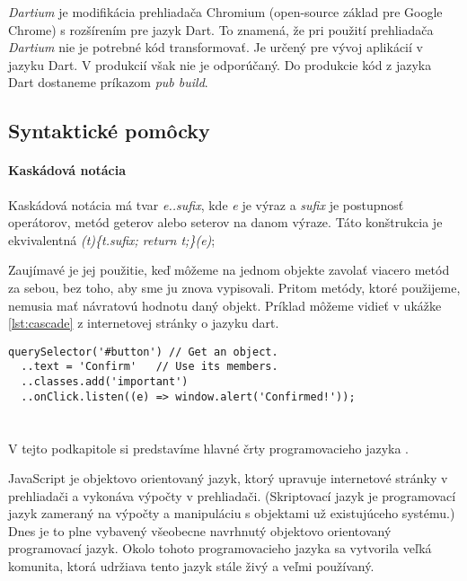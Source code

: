 \emph{Dartium} je modifikácia prehliadača Chromium (open-source základ pre Google Chrome) s rozšírením pre jazyk Dart. To znamená, že pri použití prehliadača \emph{Dartium} nie je potrebné kód transformovať. Je určený pre vývoj aplikácií v jazyku Dart. V produkcií však nie je odporúčaný. Do produkcie kód z jazyka Dart dostaneme príkazom \emph{pub build}.%

\subsection{Syntaktické pomôcky}

\paragraph{Kaskádová notácia}
Kaskádová notácia má tvar \emph{e..sufix}, kde \emph{e} je výraz a \emph{sufix} je postupnosť operátorov, metód geterov alebo seterov na danom výraze. Táto konštrukcia je ekvivalentná \emph{(t)\{t.sufix; return t;\}(e)};

Zaujímavé je jej použitie, keď môžeme na jednom objekte zavolať viacero metód za sebou, bez toho, aby sme ju znova vypisovali. Pritom metódy, ktoré použijeme, nemusia mať návratovú hodnotu daný objekt. Príklad môžeme vidieť v ukážke \ref{lst:cascade} z internetovej stránky o jazyku dart\cite{dartLanguageTour}.

\begin{lstlisting}[caption=Kaskádová notácia, label={lst:cascade}]
querySelector('#button') // Get an object.
  ..text = 'Confirm'   // Use its members.
  ..classes.add('important')
  ..onClick.listen((e) => window.alert('Confirmed!'));
\end{lstlisting}







\section{\JS{}}
\label{sec:JS}
V tejto podkapitole si predstavíme hlavné črty programovacieho jazyka \JS{}. 

JavaScript je objektovo orientovaný jazyk, ktorý upravuje internetové stránky v prehliadači a vykonáva výpočty v prehliadači.
(Skriptovací jazyk je programovací jazyk zameraný na výpočty a manipuláciu s objektami už existujúceho systému.)
Dnes je to plne vybavený všeobecne navrhnutý objektovo orientovaný programovací jazyk.
Okolo tohoto programovacieho jazyka sa vytvorila veľká komunita, ktorá udržiava tento jazyk stále živý a veľmi používaný.

